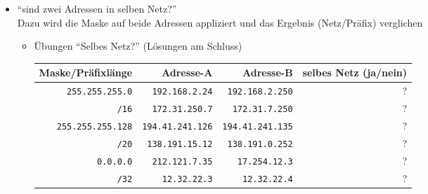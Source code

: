 \documentclass[a4paper,german]{scrartcl}
\begin{document}
\begin{itemize}
%
  \item ``sind zwei Adressen in selben Netz?''\\
    Dazu wird die Maske auf beide Adressen appliziert und das Ergebnis (Netz/Pr\"afix) verglichen
    \begin{itemize}
      \item \"Ubungen ``Selbes Netz?'' (L\"osungen am Schluss)
        \begin{center}
        \begin{tabular}{rrrr}
          Maske/Pr\"afixl\"ange & Adresse-A & Adresse-B & selbes Netz (ja/nein) \\
          \hline
          \texttt{255.255.255.0} & \texttt{192.168.2.24} & \texttt{192.168.2.250} & ? \\
          \texttt{/16} & \texttt{172.31.250.7} & \texttt{172.31.7.250} & ? \\
          \texttt{255.255.255.128} & \texttt{194.41.241.126} & \texttt{194.41.241.135} & ? \\
          \texttt{/20} & \texttt{138.191.15.12} & \texttt{138.191.0.252} & ? \\
          \texttt{0.0.0.0} & \texttt{212.121.7.35} & \texttt{17.254.12.3} & ? \\          
          \texttt{/32} & \texttt{12.32.22.3} & \texttt{12.32.22.4} & ? \\
        \end{tabular}
      \end{center}
      \vspace{0.25cm}
    \end{itemize}
    

\end{itemize}
\end{document}
